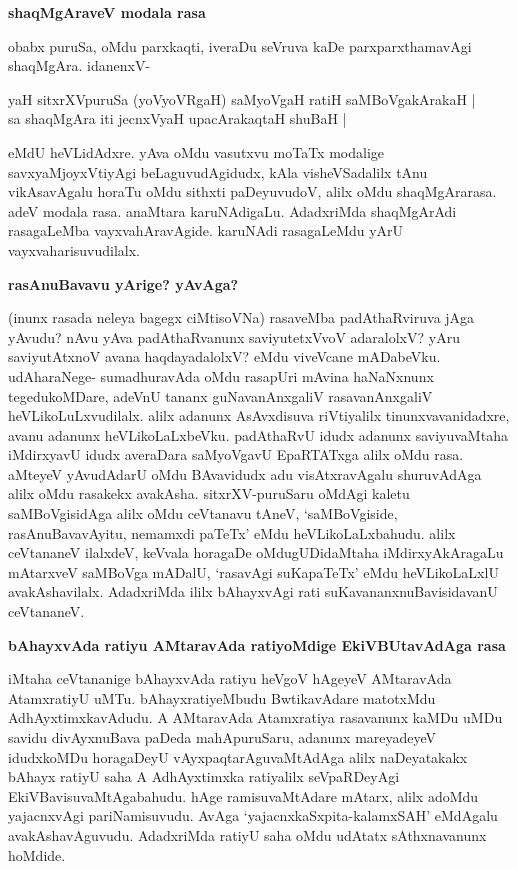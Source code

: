 {\bigskip
\noindent
{\large\bf shaqMgAraveV modala rasa}}\label{page227}
\medskip

\noindent
obabx puruSa, oMdu parxkaqti, iveraDu seVruva kaDe parxparxthamavAgi shaqMgAra. idanenxV-

\begin{shloka}
yaH sitxrXVpuruSa (yoVyoVRgaH) saMyoVgaH ratiH saMBoVgakArakaH |\\\label{227}
sa shaqMgAra iti jecnxVyaH upacArakaqtaH shuBaH |
\end{shloka}

\noindent
eMdU heVLidAdxre. yAva oMdu vasutxvu moTaTx modalige savxyaMjoyxVti\-yAgi beLaguvudAgidudx, kAla visheVSadalilx tAnu vikAsavAgalu horaTu oMdu sithxti paDeyuvudoV, alilx oMdu shaqMgAra\-rasa. adeV modala rasa. anaMtara karuNAdigaLu. AdadxriMda shaqMgArAdi rasagaLeMba vayxvahAra\-vAgide. karuNAdi rasagaLeMdu yArU vayxvaharisuvudilalx.

\eject

{\bigskip
\noindent
{\large\bf rasAnuBavavu yArige? yAvAga?}}\label{page227}
\medskip

\noindent
(inunx rasada neleya bagegx ciMtisoVNa) rasaveMba padAthaRviruva jAga yAvudu? nAvu yAva padAthaRvanunx saviyutetxVvoV adaralolxV? yAru saviyutAtxnoV avana haqdayadalolxV? eMdu viveVcane mADabeVku. udAharaNege- sumadhuravAda oMdu rasapUri mAvina haNaNxnunx tegedu\-koMDare, adeVnU tananx guNavanAnxgaliV rasavanAnxgaliV heVLikoLuLxvudilalx. alilx adanunx AsAvxdisuva riVti\-yalilx tinunx\-vavanidadxre, avanu adanunx heVLikoLaLxbeVku. padAthaRvU idudx adanunx saviyuvaMtaha iMdirxyavU idudx averaDara saMyoVgavU EpaRTATxga alilx oMdu rasa. aMteyeV yAvudAdarU oMdu BAvavidudx adu visAtxravAgalu shuruvAdAga alilx oMdu rasakekx avakAsha. sitxrXV-puruSaru oMdAgi kaletu saMBoVgisidAga alilx oMdu ceVtanavu tAneV, `saMBoVgiside, rasAnuBava\-vAyitu, nemamxdi paTeTx' eMdu heVLikoLaLxbahudu. alilx ceVtananeV ilalxdeV, keVvala horagaDe oMdugUDi\-daMtaha iMdirxyAkAragaLu mAtarxveV saMBoVga mADalU, `rasavAgi suKapaTeTx' eMdu heVLikoLaLxlU avakAsha\-vilalx. AdadxriMda ililx bAhayxvAgi rati suKavananxnuBavisidavanU ceVtananeV.

{\bigskip
\noindent
{\large\bf bAhayxvAda ratiyu AMtaravAda ratiyoMdige EkiVBUtavAdAga rasa}}\label{page228}
\medskip

\noindent
iMtaha ceVtananige bAhayxvAda ratiyu heVgoV hAgeyeV AMtaravAda Atamx\break\-ratiyU uMTu. bAhayxratiyeMbudu BwtikavAdare matotxMdu AdhAyxtimxka\-vAdudu. A AMtaravAda Atamxratiya rasa\-vanunx kaMDu uMDu savidu divAyxnuBava paDeda mahApuruSaru, adanunx mareyadeyeV idudxkoMDu horagaDeyU vAyxpaqtarAguvaMtAdAga alilx naDeyatakakx bAhayx ratiyU saha A AdhAyxtimxka ratiyalilx seVpaRDeyAgi EkiVBavisuvaMtAgabahudu. hAge ramisuvaMtAdare mAtarx, alilx adoMdu yajacnxvAgi pariNamisuvudu. AvAga `yajacnxkaSxpita-kalamxSAH'\label{228} eMdAgalu avakAshavAguvudu. AdadxriMda ratiyU saha oMdu udAtatx sAthxnavanunx hoMdide.

